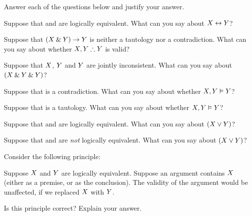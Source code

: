 \solutions
\problempart
\label{pr.TT.concepts}
Answer each of the questions below and justify your answer.
\begin{earg}
\item Suppose that \metaX and \metaY are logically equivalent. What can you say about $X\leftrightarrow Y$?
\item Suppose that $(X\mathbin{\&}Y)\rightarrow Y$ is neither a tautology nor a contradiction. What can you say about whether $\metaX, \metaY \therefore\metaY$ is valid?
\item Suppose that $X$, $Y$ and $Y$  are jointly inconsistent. What can you say about $(X\mathbin{\&}Y\mathbin{\&}Y)$?
\item Suppose that \metaX is a contradiction. What can you say about whether $X, Y \vDash Y$?
\item Suppose that \metaY is a tautology. What can you say about whether $X, Y\vDash Y$?
\item Suppose that \metaX and \metaY are logically equivalent. What can you say about $(X\vee Y)$?
\item Suppose that \metaX and \metaY are \emph{not} logically equivalent. What can you say about $(X\vee Y)$?
\end{earg}
\problempart
Consider the following principle:
	\begin{ebullet}
		\item Suppose $X$ and $Y$ are logically equivalent. Suppose an argument contains $X$ (either as a premise, or as the conclusion). The validity of the argument would be unaffected, if we replaced $X$ with $Y$.
	\end{ebullet}
Is this principle correct? Explain your answer.



